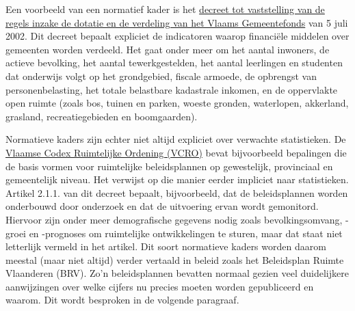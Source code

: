 \documentclass[\mainfiledir/00_handleiding_statistiekproductie.tex]{subfiles}
\begin{document}
Een voorbeeld van een normatief kader is het \href{https://codex.vlaanderen.be/PrintDocument.ashx?id=1009623&datum=&geannoteerd=false&print=false}{decreet tot vaststelling van de regels inzake de dotatie en de verdeling van het Vlaams Gemeentefonds} van 5 juli 2002. Dit decreet bepaalt expliciet de indicatoren waarop financiële middelen over gemeenten worden verdeeld. Het gaat onder meer om het aantal inwoners, de actieve bevolking, het aantal tewerkgestelden, het aantal leerlingen en studenten dat onderwijs volgt op het grondgebied, fiscale armoede, de opbrengst van personenbelasting, het totale belastbare kadastrale inkomen, en de oppervlakte open ruimte (zoals bos, tuinen en parken, woeste gronden, waterlopen, akkerland, grasland, recreatiegebieden en boomgaarden).

Normatieve kaders zijn echter niet altijd expliciet over verwachte statistieken. De \href{https://codex.vlaanderen.be/portals/codex/documenten/1018245.html}{Vlaamse Codex Ruimtelijke Ordening (VCRO)} bevat bijvoorbeeld bepalingen die de basis vormen voor ruimtelijke beleidsplannen op gewestelijk, provinciaal en gemeentelijk niveau. Het verwijst op die manier eerder impliciet naar statistieken. Artikel 2.1.1. van dit decreet bepaalt, bijvoorbeeld, dat de beleidsplannen worden onderbouwd door onderzoek en dat de uitvoering ervan wordt gemonitord. Hiervoor zijn onder meer demografische gegevens nodig zoals bevolkingsomvang, -groei en -prognoses om ruimtelijke ontwikkelingen te sturen, maar dat staat niet letterlijk vermeld in het artikel. Dit soort normatieve kaders worden daarom meestal (maar niet altijd) verder vertaald in beleid zoals het Beleidsplan Ruimte Vlaanderen (BRV). Zo'n beleidsplannen bevatten normaal gezien veel duidelijkere aanwijzingen over welke cijfers nu precies moeten worden gepubliceerd en waarom. Dit wordt besproken in de volgende paragraaf.

\end{document}
